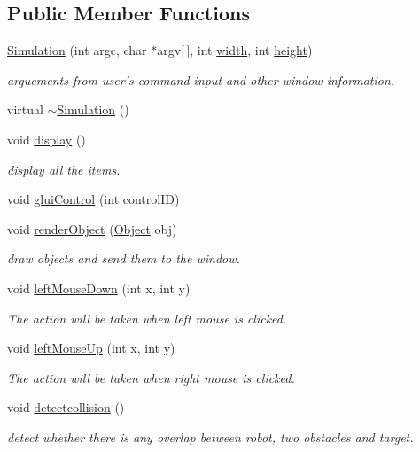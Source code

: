 \subsection*{Public Member Functions}
\begin{DoxyCompactItemize}
\item 
\hyperlink{classSimulation_a4c669ceaa34c7130966ce45f9de75fbe}{Simulation} (int argc, char $\ast$argv\mbox{[}$\,$\mbox{]}, int \hyperlink{classBaseGfxApp_ace089a1a94fb6bb0bc17e1b7fa48e05d}{width}, int \hyperlink{classBaseGfxApp_aa253dbe16a20c40e0a1bf8ff942ceea3}{height})
\begin{DoxyCompactList}\small\item\em arguements from user's command input and other window information. \end{DoxyCompactList}\item 
virtual \hyperlink{classSimulation_a80fad3f57dfaf195a36f7bc49bc88279}{$\sim$\-Simulation} ()
\item 
void \hyperlink{classSimulation_a449dcb7d97dfba99efe770de2f399c31}{display} ()
\begin{DoxyCompactList}\small\item\em display all the items. \end{DoxyCompactList}\item 
void \hyperlink{classSimulation_a1607cd18e552ab9f4a6f57d362f7121a}{glui\-Control} (int control\-I\-D)
\item 
void \hyperlink{classSimulation_aff50d6f9d754e3690455f038f7250e13}{render\-Object} (\hyperlink{classObject}{Object} obj)
\begin{DoxyCompactList}\small\item\em draw objects and send them to the window. \end{DoxyCompactList}\item 
void \hyperlink{classSimulation_a786d1ba31d29937f0ac6f3ea88f8a607}{left\-Mouse\-Down} (int x, int y)
\begin{DoxyCompactList}\small\item\em The action will be taken when left mouse is clicked. \end{DoxyCompactList}\item 
void \hyperlink{classSimulation_a62ef254d85017074cd521a5787b5a234}{left\-Mouse\-Up} (int x, int y)
\begin{DoxyCompactList}\small\item\em The action will be taken when right mouse is clicked. \end{DoxyCompactList}\item 
void \hyperlink{classSimulation_a6a27947a5930814ce49a64031cb7bd20}{detectcollision} ()
\begin{DoxyCompactList}\small\item\em detect whether there is any overlap between robot, two obstacles and target. \end{DoxyCompactList}\end{DoxyCompactItemize}
